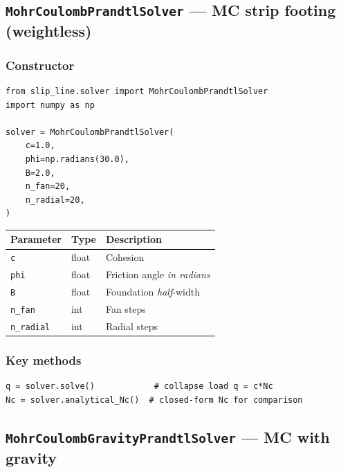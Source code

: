\documentclass[11pt,a4paper]{article}
\begin{document}
\subsection{\texttt{MohrCoulombPrandtlSolver} — MC strip footing (weightless)}
\label{sec:mc}

\subsubsection*{Constructor}

\begin{lstlisting}
from slip_line.solver import MohrCoulombPrandtlSolver
import numpy as np

solver = MohrCoulombPrandtlSolver(
    c=1.0,
    phi=np.radians(30.0),
    B=2.0,
    n_fan=20,
    n_radial=20,
)
\end{lstlisting}

\begin{center}
\begin{tabular}{lll}
\toprule
Parameter & Type & Description \\
\midrule
\texttt{c}    & float & Cohesion \\
\texttt{phi}  & float & Friction angle \emph{in radians} \\
\texttt{B}    & float & Foundation \emph{half}-width \\
\texttt{n\_fan}    & int & Fan steps \\
\texttt{n\_radial} & int & Radial steps \\
\bottomrule
\end{tabular}
\end{center}

\subsubsection*{Key methods}

\begin{lstlisting}
q = solver.solve()            # collapse load q = c*Nc
Nc = solver.analytical_Nc()  # closed-form Nc for comparison
\end{lstlisting}

\subsection{\texttt{MohrCoulombGravityPrandtlSolver} — MC with gravity}
\label{sec:mcgrav}
\end{document}
